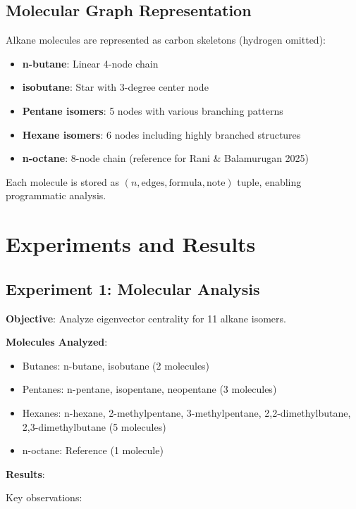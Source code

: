 \documentclass[12pt]{article}
\begin{document}
\subsection{Molecular Graph Representation}

Alkane molecules are represented as carbon skeletons (hydrogen omitted):

\begin{itemize}
    \item \textbf{n-butane}: Linear 4-node chain
    \item \textbf{isobutane}: Star with 3-degree center node
    \item \textbf{Pentane isomers}: 5 nodes with various branching patterns
    \item \textbf{Hexane isomers}: 6 nodes including highly branched structures
    \item \textbf{n-octane}: 8-node chain (reference for Rani \& Balamurugan 2025)
\end{itemize}

Each molecule is stored as $(n, \text{edges}, \text{formula}, \text{note})$ tuple, enabling programmatic analysis.

\section{Experiments and Results}

\subsection{Experiment 1: Molecular Analysis}

\textbf{Objective}: Analyze eigenvector centrality for 11 alkane isomers.

\textbf{Molecules Analyzed}:
\begin{itemize}
    \item Butanes: n-butane, isobutane (2 molecules)
    \item Pentanes: n-pentane, isopentane, neopentane (3 molecules)
    \item Hexanes: n-hexane, 2-methylpentane, 3-methylpentane, 2,2-dimethylbutane, 2,3-dimethylbutane (5 molecules)
    \item n-octane: Reference (1 molecule)
\end{itemize}

\textbf{Results}:

Key observations:
\end{document}
